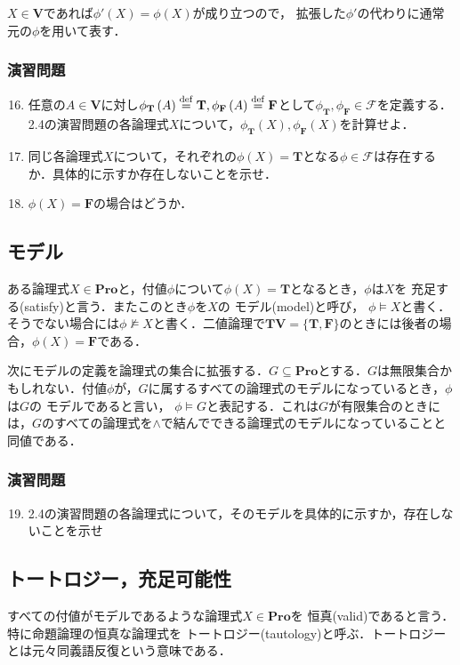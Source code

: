 \documentclass{ltjsarticle}
\theoremstyle{mystyle1}
\theoremstyle{mystyle3}
\theoremstyle{mystyle2}
\newcommand{\bT}{\ensuremath{\mathbf{T}}}
\newcommand{\bF}{\ensuremath{\mathbf{F}}}
\newcommand{\bV}{\ensuremath{\mathbf{V}}}
\newcommand{\bPro}{\ensuremath{\mathbf{Pro}}}
\newcommand{\cF}{\ensuremath{\mathcal{F}}}
\newcommand{\dequal}{\ensuremath{\stackrel{\rm{def}}{=}}}
\newcommand{\red}[1]{{\color{red} #1}}
\begin{document}
$X\in\bV$であれば$\phi'\left(X\right) =\phi\left(X\right)$が成り立つので， 拡張した$\phi'$の代わりに通常元の$\phi$を用いて表す．
\subsubsection*{演習問題}
\begin{enumerate}
  \setcounter{enumi}{15}
  \item 任意の$A\in\bV$に対し$\phi_\bT\left(A\right)\dequal\bT,\phi_\bF\left(A\right)\dequal\bF$として$\phi_\bT,\phi_\bF\in\cF$を定義する．2.4の演習問題の各論理式$X$について，$\phi_\bT\left(X\right),\phi_\bF\left(X\right)$を計算せよ．
  \item 同じ各論理式$X$について，それぞれの$\phi\left(X\right)=\bT$となる$\phi\in\cF$は存在するか．具体的に示すか存在しないことを示せ．
  \item $\phi\left(X\right)=\bF$の場合はどうか．
\end{enumerate}
\subsection{モデル}
ある論理式$X\in\bPro$と，付値$\phi$について$\phi\left(X\right)=\bT$となるとき，$\phi$は$X$を\red{充足する}(satisfy)と言う．またこのとき$\phi$を$X$の\red{モデル}(model)と呼び，\red{$\phi\models X$}と書く．そうでない場合には$\phi\not\models X$と書く．二値論理で$\bT\bV = \{\bT, \bF\}$のときには後者の場合，$\phi\left(X\right) = \bF$である．

次にモデルの定義を論理式の集合に拡張する．$G\subseteq\bPro$とする．$G$は無限集合かもしれない．付値$\phi$が，$G$に属するすべての論理式のモデルになっているとき，$\phi$は$G$の\red{モデル}であると言い，\red{$\phi\models G$}と表記する．これは$G$が有限集合のときには，$G$のすべての論理式を$\wedge$で結んでできる論理式のモデルになっていることと同値である．
\subsubsection*{演習問題}
\begin{enumerate}
  \setcounter{enumi}{18}
  \item 2.4の演習問題の各論理式について，そのモデルを具体的に示すか，存在しないことを示せ
\end{enumerate}
\subsection{トートロジー，充足可能性}
すべての付値がモデルであるような論理式$X\in\bPro$を\red{恒真}(valid)であると言う．特に命題論理の恒真な論理式を\red{トートロジー}(tautology)と呼ぶ．トートロジーとは元々同義語反復という意味である．
\end{document}
